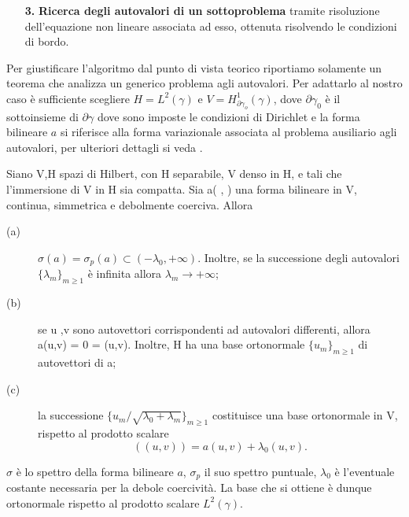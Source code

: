\begin{itemize}
{}{Esempio - Robin BC}

\item[\textbf{3.}] \textbf{Ricerca degli autovalori di un sottoproblema} tramite risoluzione dell'equazione non lineare associata ad esso, ottenuta risolvendo le condizioni di bordo.
\end{itemize}
Per giustificare l'algoritmo dal punto di vista teorico riportiamo solamente un teorema
che analizza un generico problema agli autovalori. Per adattarlo al nostro caso
\`e sufficiente scegliere $H=L^2(\gamma)$ e $V=H^1_{\partial\gamma_o}(\gamma)$, dove $\partial\gamma_0$ \`e il sottoinsieme
di $\partial\gamma$ dove sono imposte le condizioni di Dirichlet e la forma bilineare $a$ si riferisce alla forma variazionale
associata al problema ausiliario agli autovalori, per ulteriori dettagli si veda \cite{salsaedp}.
\begin{teorema}
\label{teo: salsa}
Siano V,H spazi di Hilbert, con H separabile, V denso in H, e tali che
l'immersione di V in H sia compatta. Sia a( , ) una forma bilineare in V,
continua, simmetrica e debolmente coerciva. 
Allora
\begin{description}
\item[(a)] $\sigma(a)=\sigma_p(a)\subset(-\lambda_0,+\infty)$. Inoltre, se la successione degli autovalori $\{\lambda_m \}_{m\geq 1}$ \`e infinita allora $\lambda_m\rightarrow +\infty$;
\item[(b)] se u ,v sono autovettori corrispondenti ad autovalori differenti, allora a(u,v) = 0 = (u,v). Inoltre, H ha una base ortonormale $\{ u_m \}_{m\geq 1}$ di autovettori di a;
\item[(c)] la successione $\{u_m / \sqrt{\lambda_0+\lambda_m} \}_{m\geq 1}$ costituisce una base ortonormale in V, rispetto al prodotto scalare
\begin{displaymath}
((u,v))=a(u,v)+\lambda_0 (u,v).
\end{displaymath}
\end{description}
\end{teorema}
$\sigma$ \`e lo spettro della forma bilineare $a$, $\sigma_p$ il suo spettro puntuale, $\lambda_0$ \`e l'eventuale costante necessaria per la debole coercivit\`a.
La base che si ottiene \`e dunque ortonormale rispetto al prodotto scalare $L^2(\gamma)$.

